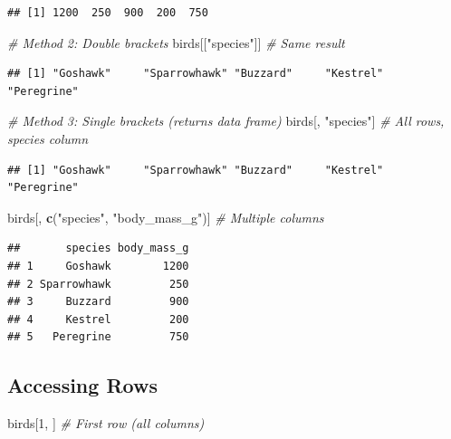 \documentclass[
]{article}
\newenvironment{Shaded}{\begin{snugshade}}{\end{snugshade}}
\newcommand{\CommentTok}[1]{\textcolor[rgb]{0.56,0.35,0.01}{\textit{#1}}}
\newcommand{\DecValTok}[1]{\textcolor[rgb]{0.00,0.00,0.81}{#1}}
\newcommand{\FunctionTok}[1]{\textcolor[rgb]{0.13,0.29,0.53}{\textbf{#1}}}
\newcommand{\NormalTok}[1]{#1}
\newcommand{\StringTok}[1]{\textcolor[rgb]{0.31,0.60,0.02}{#1}}
\begin{document}
\begin{verbatim}
## [1] 1200  250  900  200  750
\end{verbatim}

\begin{Shaded}
\begin{Highlighting}[]
\CommentTok{\# Method 2: Double brackets}
\NormalTok{birds[[}\StringTok{"species"}\NormalTok{]]      }\CommentTok{\# Same result}
\end{Highlighting}
\end{Shaded}

\begin{verbatim}
## [1] "Goshawk"     "Sparrowhawk" "Buzzard"     "Kestrel"     "Peregrine"
\end{verbatim}

\begin{Shaded}
\begin{Highlighting}[]
\CommentTok{\# Method 3: Single brackets (returns data frame)}
\NormalTok{birds[, }\StringTok{"species"}\NormalTok{]      }\CommentTok{\# All rows, species column}
\end{Highlighting}
\end{Shaded}

\begin{verbatim}
## [1] "Goshawk"     "Sparrowhawk" "Buzzard"     "Kestrel"     "Peregrine"
\end{verbatim}

\begin{Shaded}
\begin{Highlighting}[]
\NormalTok{birds[, }\FunctionTok{c}\NormalTok{(}\StringTok{"species"}\NormalTok{, }\StringTok{"body\_mass\_g"}\NormalTok{)]  }\CommentTok{\# Multiple columns}
\end{Highlighting}
\end{Shaded}

\begin{verbatim}
##       species body_mass_g
## 1     Goshawk        1200
## 2 Sparrowhawk         250
## 3     Buzzard         900
## 4     Kestrel         200
## 5   Peregrine         750
\end{verbatim}

\subsection{Accessing Rows}\label{accessing-rows}

\begin{Shaded}
\begin{Highlighting}[]
\NormalTok{birds[}\DecValTok{1}\NormalTok{, ]              }\CommentTok{\# First row (all columns)}
\end{Highlighting}
\end{Shaded}
\end{document}
